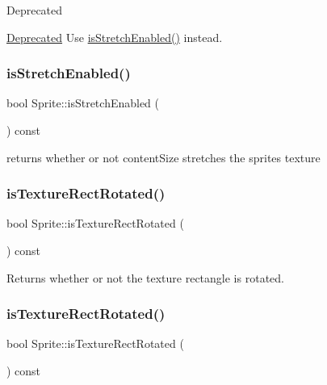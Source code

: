 \begin{DoxyRefDesc}{Deprecated}
\item[\hyperlink{deprecated__deprecated000275}{Deprecated}]Use \hyperlink{classSprite_a93f42a17bbaabec6399aab235477a4c4}{is\+Stretch\+Enabled()} instead. \end{DoxyRefDesc}
\mbox{\label{classSprite_a93f42a17bbaabec6399aab235477a4c4}} 
\subsubsection{\texorpdfstring{is\+Stretch\+Enabled()}{isStretchEnabled()}}
{\footnotesize\ttfamily bool Sprite\+::is\+Stretch\+Enabled (\begin{DoxyParamCaption}{ }\end{DoxyParamCaption}) const}

returns whether or not content\+Size stretches the sprite\textquotesingle{}s texture \mbox{\label{classSprite_a917556f400941297e60a749c4dd01847}} 
\subsubsection{\texorpdfstring{is\+Texture\+Rect\+Rotated()}{isTextureRectRotated()}\hspace{0.1cm}{\footnotesize\ttfamily [1/2]}}
{\footnotesize\ttfamily bool Sprite\+::is\+Texture\+Rect\+Rotated (\begin{DoxyParamCaption}{ }\end{DoxyParamCaption}) const\hspace{0.3cm}{\ttfamily [inline]}}

Returns whether or not the texture rectangle is rotated. \mbox{\label{classSprite_a917556f400941297e60a749c4dd01847}} 
\subsubsection{\texorpdfstring{is\+Texture\+Rect\+Rotated()}{isTextureRectRotated()}\hspace{0.1cm}{\footnotesize\ttfamily [2/2]}}
{\footnotesize\ttfamily bool Sprite\+::is\+Texture\+Rect\+Rotated (\begin{DoxyParamCaption}{ }\end{DoxyParamCaption}) const\hspace{0.3cm}{\ttfamily [inline]}}

